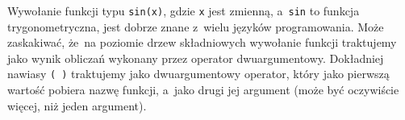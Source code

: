 \documentclass[10pt,t]{beamer}
\begin{document}
\begin{frame}
  Wywołanie funkcji typu \texttt{sin(x)}, gdzie \texttt{x} jest zmienną,
  a~\texttt{sin} to funkcja trygonometryczna, jest dobrze znane z~wielu
  języków programowania. Może zaskakiwać, że~na poziomie drzew składniowych
  wywołanie funkcji traktujemy jako wynik obliczań wykonany przez
  operator \alert{dwuargumentowy}. Dokładniej nawiasy \texttt{( )}
  traktujemy jako \alert{dwuargumentowy} operator, który jako pierwszą
  wartość pobiera nazwę funkcji, a~jako drugi jej argument (może być
  oczywiście więcej, niż jeden argument).

\end{frame}
\end{document}
